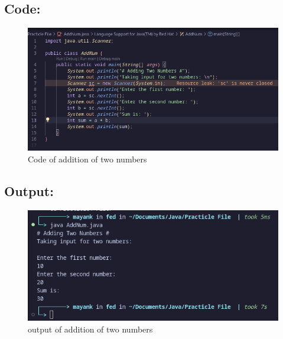 \documentclass[a4paper,12pt]{article}
\begin{document}
\subsection{Code: }
\begin{figure}[H]
    \centering
    \includegraphics[width=0.9\linewidth]{images/add_num.png}
    \caption{Code of addition of two numbers}
    \label{fig:sample_image}
\end{figure}
\subsection{Output: }
\begin{figure}[H]
    \centering
    \includegraphics[width=0.9\linewidth]{images/output1.png}
    \caption{output of addition of two numbers}
    \label{fig:sample_image}
\end{figure}
\end{document}
